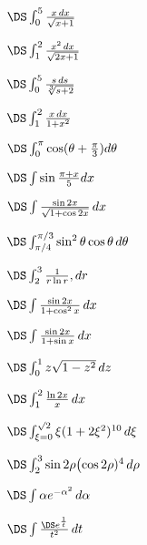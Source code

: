 \begin{multicols}{2}
\problem \(\DS \int_0^5 \frac{x\, dx}{\sqrt{x+1}}\)

\problem \(\DS \int_1^2 \frac{x^2\, dx}{\sqrt{2x+1}}\)

\problem \(\DS \int_0^5 \frac{s\, ds}{\sqrt[3]{s+2}}\)

\problem \(\DS \int_1^2\frac{x\, d x}{1+x^2}\)

\problem \(\DS \int_0^\pi \cos(\theta+\tfrac\pi3)d\theta\)

\problem \(\DS \int \sin\frac{\pi+x}{5} dx\)

\problem \(\DS \int \frac{\sin 2x}{\sqrt{1+\cos 2x}} \,dx\)

\problem \(\DS \int_{\pi/4}^{\pi/3} \sin^2\theta\cos\theta\, d \theta \)

\problem \(\DS \int_{2}^{3} \frac{1}{r\ln r}, d r\)

\problem \(\DS \int \frac{\sin 2x}{1+\cos^2x}\,dx\)

\problem \(\DS \int \frac{\sin 2x}{1+\sin x}\,dx \)

\problem \(\DS \int_{0}^{1} z\sqrt{1-z^2}\, d z\)

\problem \(\DS \int_1^2 \frac{\ln 2x}x \, d x\)

\problem \(\DS \int_{\xi=0}^{\surd2} \xi (1+2\xi^2)^{10} \, d \xi \)

\problem \(\DS \int_{2}^{3} \sin 2\rho \bigl(\cos 2\rho)^4 \, d\rho\)

\problem \(\DS \int \alpha e^{-\alpha^2}\, d\alpha\)

\problem \(\DS \int \frac{\DS e^{\frac1t}}{t^2}\, d t \)

\end{multicols}
\noproblemfont


